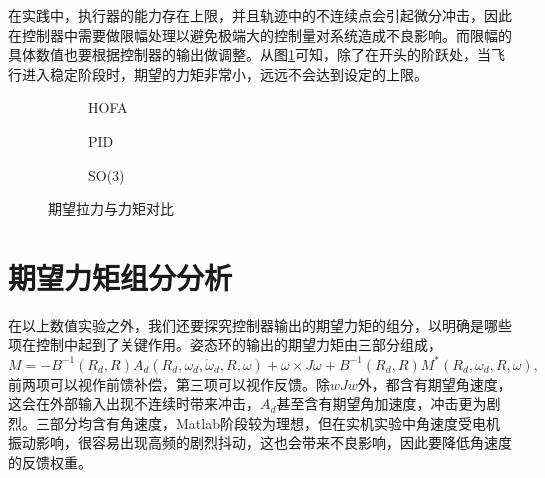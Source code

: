 在实践中，执行器的能力存在上限，并且轨迹中的不连续点会引起微分冲击，因此在控制器中需要做限幅处理以避免极端大的控制量对系统造成不良影响。而限幅的具体数值也要根据控制器的输出做调整。从图\ref{matlab_fM}可知，除了在开头的阶跃处，当飞行进入稳定阶段时，期望的力矩非常小，远远不会达到设定的上限。
\begin{figure}[!h]
  \centering
  \begin{subfigure}[t]{0.33\textwidth}
    \centering
    \caption{HOFA}
  \end{subfigure}\hfill
  \begin{subfigure}[t]{0.33\textwidth}
    \centering
    \caption{PID}
  \end{subfigure}\hfill
  \begin{subfigure}[t]{0.33\textwidth}
    \centering
    \caption{SO(3)}
  \end{subfigure}
  \caption{期望拉力与力矩对比}
  \label{matlab_fM}
\end{figure}



\section{期望力矩组分分析}
在以上数值实验之外，我们还要探究控制器输出的期望力矩的组分，以明确是哪些项在控制中起到了关键作用。姿态环的输出的期望力矩由三部分组成，
$$M=-B^{-1}(R_d,R) A_d(R_d,\omega_d,\dot \omega_d,R,\omega)+\omega \times J\omega +B^{-1}(R_d,R)M^*(R_d,\omega_d,R,\omega),$$
前两项可以视作前馈补偿，第三项可以视作反馈。除$wJw$外，都含有期望角速度，这会在外部输入出现不连续时带来冲击，$A_d$甚至含有期望角加速度，冲击更为剧烈。三部分均含有角速度，Matlab阶段较为理想，但在实机实验中角速度受电机振动影响，很容易出现高频的剧烈抖动，这也会带来不良影响，因此要降低角速度的反馈权重。

